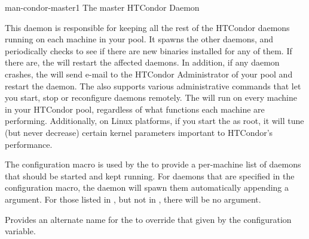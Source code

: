 \begin{ManPage}{}{man-condor-master}{1}
{The master HTCondor Daemon}

\Synopsis {}

\Description 

This daemon is responsible for keeping all the
rest of the HTCondor daemons running on each machine in your pool.  It  
spawns the other daemons, and periodically checks to see if there are
new binaries installed for any of them.  If there are,
the  will restart the affected daemons.
In addition, if any daemon crashes, the
 will send e-mail to the HTCondor Administrator of your pool and 
restart the daemon.  The  also supports various
administrative commands that let you start, stop or reconfigure
daemons remotely.  The  will run on every machine in 
your HTCondor pool, regardless of what functions each machine are
performing.  Additionally, on Linux platforms, if you start the
 as root, it will tune (but never decrease) certain
kernel parameters important to HTCondor's performance.


The  configuration macro is used by the
 to provide a per-machine list of daemons that
should be started and kept running.
For daemons that are specified in the 
configuration macro,
the  daemon will spawn them automatically
appending a  argument.
For those listed in , but not in ,
there will be no  argument.

\begin{Options}
            {Provides an alternate name for the 
            to override that given by the 
	    configuration variable.
            }
\end{Options}

\end{ManPage}
